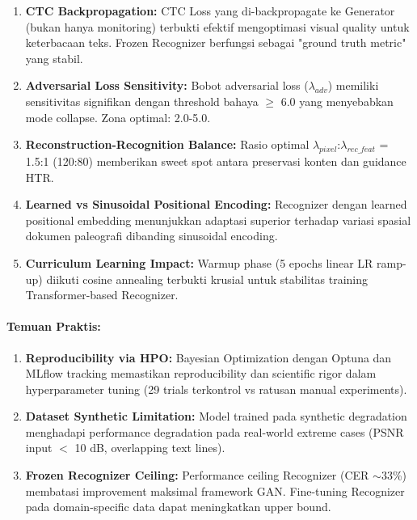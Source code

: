 \documentclass[12pt,a4paper]{article}
\begin{document}
\begin{enumerate}[label=\arabic*., leftmargin=0.5cm]
    \item \textbf{CTC Backpropagation:} CTC Loss yang di-backpropagate ke Generator (bukan hanya monitoring) terbukti efektif mengoptimasi visual quality untuk keterbacaan teks. Frozen Recognizer berfungsi sebagai "ground truth metric" yang stabil.
    
    \item \textbf{Adversarial Loss Sensitivity:} Bobot adversarial loss ($\lambda_{adv}$) memiliki sensitivitas signifikan dengan threshold bahaya $\geq$ 6.0 yang menyebabkan mode collapse. Zona optimal: 2.0-5.0.
    
    \item \textbf{Reconstruction-Recognition Balance:} Rasio optimal $\lambda_{pixel}$:$\lambda_{rec\_feat}$ = 1.5:1 (120:80) memberikan sweet spot antara preservasi konten dan guidance HTR.
    
    \item \textbf{Learned vs Sinusoidal Positional Encoding:} Recognizer dengan learned positional embedding menunjukkan adaptasi superior terhadap variasi spasial dokumen paleografi dibanding sinusoidal encoding.
    
    \item \textbf{Curriculum Learning Impact:} Warmup phase (5 epochs linear LR ramp-up) diikuti cosine annealing terbukti krusial untuk stabilitas training Transformer-based Recognizer.
\end{enumerate}

\paragraph{Temuan Praktis:}

\begin{enumerate}[label=\arabic*., leftmargin=0.5cm]
    \item \textbf{Reproducibility via HPO:} Bayesian Optimization dengan Optuna dan MLflow tracking memastikan reproducibility dan scientific rigor dalam hyperparameter tuning (29 trials terkontrol vs ratusan manual experiments).
    
    \item \textbf{Dataset Synthetic Limitation:} Model trained pada synthetic degradation menghadapi performance degradation pada real-world extreme cases (PSNR input $<$ 10 dB, overlapping text lines).
    
    \item \textbf{Frozen Recognizer Ceiling:} Performance ceiling Recognizer (CER $\sim$33\%) membatasi improvement maksimal framework GAN. Fine-tuning Recognizer pada domain-specific data dapat meningkatkan upper bound.
\end{enumerate}
\end{document}
